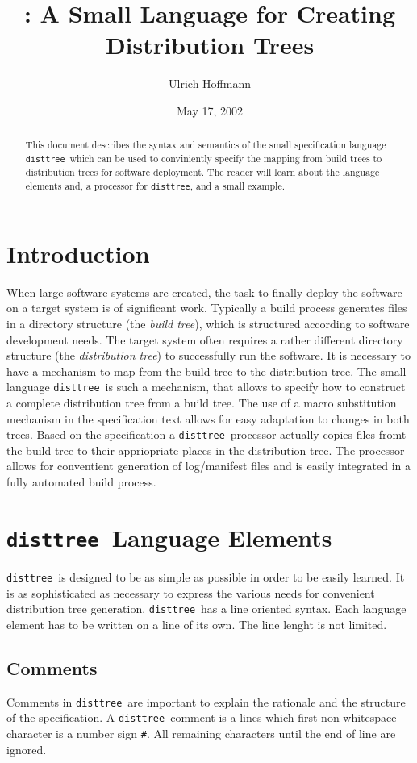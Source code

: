 \documentclass{article}
\title{\disttree: A Small Language for Creating Distribution Trees}
\author{Ulrich Hoffmann}
\date{May 17, 2002}
\newcommand{\disttree}{{\tt disttree}}
\begin{document}
\maketitle

\begin{abstract}
This document describes the syntax and semantics of the small
specification language \disttree\ which can be used to conviniently
specify the mapping from build trees to distribution trees for
software deployment. The reader will learn about the language elements
and, a processor for \disttree, and a small example.
\end{abstract}

\section{Introduction}
When large software systems are created, the task to finally deploy
the software on a target system is of significant work. Typically a
build process generates files in a directory structure (the {\em build
  tree}), which is structured according to software development needs.
The target system often requires a rather different directory
structure (the {\em distribution tree}) to successfully run the
software. It is necessary to have a mechanism to map from the build
tree to the distribution tree. The small language \disttree\ is such a
mechanism, that allows to specify how to construct a complete
distribution tree from a build tree. The use of a macro substitution
mechanism in the specification text allows for easy adaptation to
changes in both trees. Based on the specification a \disttree\ 
processor actually copies files fromt the build tree to their
appriopriate places in the distribution tree. The processor allows for
conventient generation of log/manifest files and is easily
integrated in a fully automated build process.

\section{\disttree\ Language Elements}
\disttree\ is designed to be as simple as possible in order to be
easily learned. It is as sophisticated as necessary to express the
various needs for convenient distribution tree generation.
\disttree\ has a line oriented syntax. Each language element has to
be written on a line of its own. The line lenght is not limited.

\subsection{Comments}
Comments in \disttree\ are important to explain the rationale and the
structure of the specification. A \disttree\ comment is a lines which
first non whitespace character is a number sign {\tt \#}. All
remaining characters until the end of line are ignored.
\end{document}
